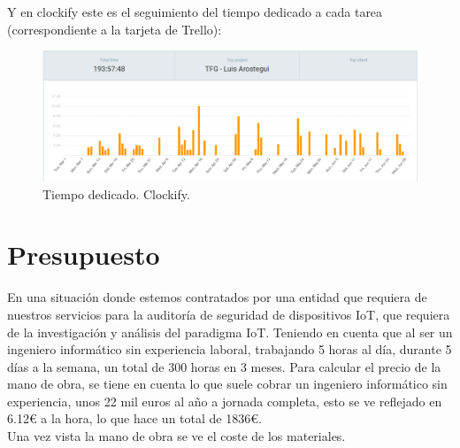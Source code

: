 \newpage

Y en clockify este es el seguimiento del tiempo dedicado a cada tarea (correspondiente a la tarjeta de Trello):


\begin{figure}[hb!]
    \centering
    \includegraphics[width=\linewidth]{imagenes/clockify.png}
    \caption{Tiempo dedicado. Clockify.}
    \label{fig:figure8-plan}
\end{figure}




\chapter{Presupuesto}

En una situación donde estemos contratados por una entidad que requiera de nuestros servicios para la auditoría de seguridad de dispositivos IoT, que requiera de la investigación y análisis del paradigma IoT. Teniendo en cuenta que al ser un ingeniero informático sin experiencia laboral, trabajando 5 horas al día, durante 5 días a la semana, un total de 300 horas en 3 meses. Para calcular el precio de la mano de obra, se tiene en cuenta lo que suele cobrar un ingeniero informático sin experiencia, unos 22 mil euros al año a jornada completa, esto se ve reflejado en 6.12€ a la hora, lo que hace un total de 1836€. \\

Una vez vista la mano de obra se ve el coste de los materiales.

